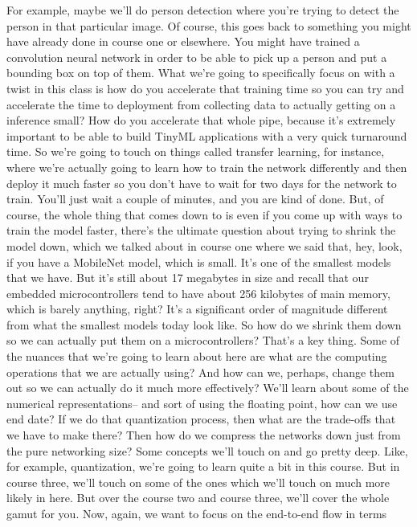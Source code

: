 For example, maybe we'll do person detection
where you're trying to detect the person in that particular image.
Of course, this goes back to something you might have already done
in course one or elsewhere.
You might have trained a convolution neural network in order
to be able to pick up a person and put a bounding box on top of them.
What we're going to specifically focus on with a twist in this class
is how do you accelerate that training time so you can try and accelerate
the time to deployment from collecting data to actually getting on a inference
small?
How do you accelerate that whole pipe, because it's extremely important
to be able to build TinyML applications with a very quick turnaround time.
So we're going to touch on things called transfer learning, for instance, where
we're actually going to learn how to train
the network differently and then deploy it much faster so you don't have to wait
for two days for the network to train.
You'll just wait a couple of minutes, and you are kind of done.
But, of course, the whole thing that comes down to
is even if you come up with ways to train the model faster,
there's the ultimate question about trying to shrink the model down,
which we talked about in course one where we said that, hey, look,
if you have a MobileNet model, which is small.
It's one of the smallest models that we have.
But it's still about 17 megabytes in size and recall
that our embedded microcontrollers tend to have
about 256 kilobytes of main memory, which is barely anything, right?
It's a significant order of magnitude different from what
the smallest models today look like.
So how do we shrink them down so we can actually
put them on a microcontrollers?
That's a key thing.
Some of the nuances that we're going to learn about here
are what are the computing operations that we are actually using?
And how can we, perhaps, change them out so we can actually
do it much more effectively?
We'll learn about some of the numerical representations-- and sort
of using the floating point, how can we use end date?
If we do that quantization process, then what
are the trade-offs that we have to make there?
Then how do we compress the networks down just
from the pure networking size?
Some concepts we'll touch on and go pretty deep.
Like, for example, quantization, we're going to learn quite a bit
in this course.
But in course three, we'll touch on some of the ones
which we'll touch on much more likely in here.
But over the course two and course three,
we'll cover the whole gamut for you.
Now, again, we want to focus on the end-to-end flow in terms
